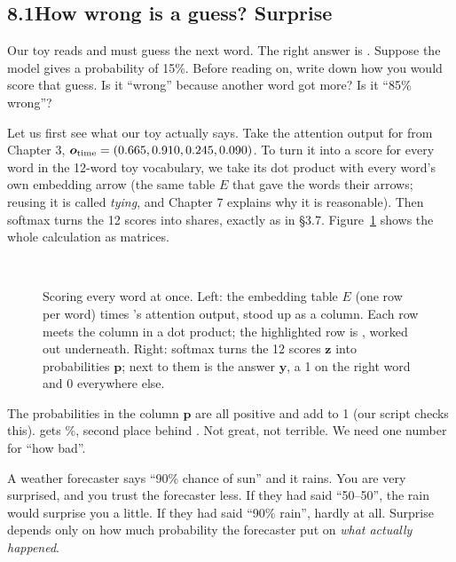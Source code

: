 \subsection*{8.1\quad How wrong is a guess? Surprise}

\Predict Our toy reads  and must guess the next word. The right answer is
. Suppose the model gives  a probability of 15\%. Before reading on, write down how
you would score that guess. Is it ``wrong'' because another word got more? Is it ``85\% wrong''?

Let us first see what our toy actually says. Take the attention output for  from Chapter 3,
$\bm{o}_{\text{time}}=(0.665, 0.910, 0.245, 0.090)$. To turn it into a score for every word in the 12-word toy vocabulary,
we take its dot product with every word's own embedding arrow (the same table $E$ that gave the words their
arrows; reusing it is called \emph{tying}, and Chapter 7 explains why it is reasonable). Then softmax turns the 12 scores into shares, exactly as in \S3.7. Figure~\ref{fig:ch8scores} shows the whole calculation as matrices.

\begin{figure}[!tbp]
\centering
\fitR{}\\[3pt]

\caption{Scoring every word at once. Left: the embedding table $E$ (one row per word) times 's
attention output, stood up as a column. Each row meets the column in a dot product; the highlighted row is
, worked out underneath. Right: softmax turns the 12 scores $\bm{z}$ into probabilities $\bm{p}$;
next to them is the answer $\bm{y}$, a 1 on the right word and 0 everywhere else.}
\label{fig:ch8scores}
\end{figure}

\Sanity The probabilities in the column $\bm{p}$ are all positive and add to 1 (our script checks this).
 gets
\nEightPctSorry\%, second place behind \tok{\nEightTopWord}. Not great, not terrible. We need one number
for ``how bad''.

\Picture A weather forecaster says ``90\% chance of sun'' and it rains. You are very surprised, and you
trust the forecaster less. If they had said ``50--50'', the rain would surprise you a little. If they had
said ``90\% rain'', hardly at all. Surprise depends only on how much probability the forecaster put on
\emph{what actually happened}.

